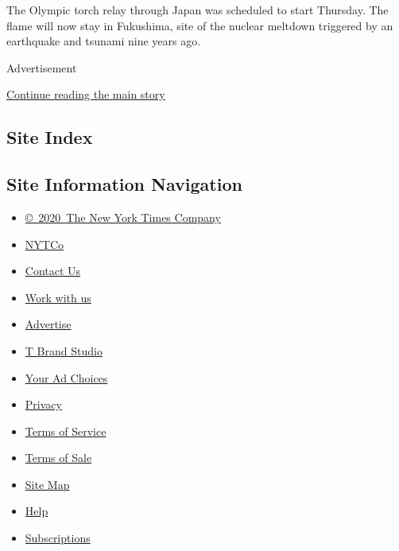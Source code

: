 The Olympic torch relay through Japan was scheduled to start Thursday.
The flame will now stay in Fukushima, site of the nuclear meltdown
triggered by an earthquake and tsunami nine years ago.

Advertisement

\protect\hyperlink{after-bottom}{Continue reading the main story}

\hypertarget{site-index}{%
\subsection{Site Index}\label{site-index}}

\hypertarget{site-information-navigation}{%
\subsection{Site Information
Navigation}\label{site-information-navigation}}

\begin{itemize}
\tightlist
\item
  \href{https://help.nytimes.com/hc/en-us/articles/115014792127-Copyright-notice}{©~2020~The
  New York Times Company}
\end{itemize}

\begin{itemize}
\tightlist
\item
  \href{https://www.nytco.com/}{NYTCo}
\item
  \href{https://help.nytimes.com/hc/en-us/articles/115015385887-Contact-Us}{Contact
  Us}
\item
  \href{https://www.nytco.com/careers/}{Work with us}
\item
  \href{https://nytmediakit.com/}{Advertise}
\item
  \href{http://www.tbrandstudio.com/}{T Brand Studio}
\item
  \href{https://www.nytimes.com/privacy/cookie-policy\#how-do-i-manage-trackers}{Your
  Ad Choices}
\item
  \href{https://www.nytimes.com/privacy}{Privacy}
\item
  \href{https://help.nytimes.com/hc/en-us/articles/115014893428-Terms-of-service}{Terms
  of Service}
\item
  \href{https://help.nytimes.com/hc/en-us/articles/115014893968-Terms-of-sale}{Terms
  of Sale}
\item
  \href{https://spiderbites.nytimes.com}{Site Map}
\item
  \href{https://help.nytimes.com/hc/en-us}{Help}
\item
  \href{https://www.nytimes.com/subscription?campaignId=37WXW}{Subscriptions}
\end{itemize}
